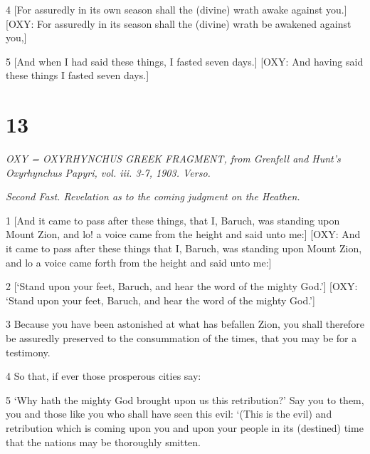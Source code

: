 \par [And be not greatly up lifted and boastful.] [OXY: Nor condemn greatly.]

\par 4 [For assuredly in its own season shall the (divine) wrath awake against you.] [OXY: For assuredly in its season shall the (divine) wrath be awakened against you,]

\par [Which now in long-suffering is held in as it were by reins.] [OXY: Which is now restrained by long-suffering as it were by a rein.]

\par 5 [And when I had said these things, I fasted seven days.] [OXY: And having said these things I fasted seven days.]


\chapter{13}

\par \textit{OXY = OXYRHYNCHUS GREEK FRAGMENT, from Grenfell and Hunt's Oxyrhynchus Papyri, vol. iii. 3-7, 1903. Verso.}

\par \textit{Second Fast. Revelation as to the coming judgment on the Heathen.}

\par 1 [And it came to pass after these things, that I, Baruch, was standing upon Mount Zion, and lo! a voice came from the height and said unto me:] [OXY: And it came to pass after these things that I, Baruch, was standing upon Mount Zion, and lo a voice came forth from the height and said unto me:]

\par 2 [‘Stand upon your feet, Baruch, and hear the word of the mighty God.’] [OXY: ‘Stand upon your feet, Baruch, and hear the word of the mighty God.’]

\par 3 Because you have been astonished at what has befallen Zion, you shall therefore be assuredly preserved to the consummation of the times, that you may be for a testimony. 

\par 4 So that, if ever those prosperous cities say: 

\par 5 ‘Why hath the mighty God brought upon us this retribution?’ Say you to them, you and those like you who shall have seen this evil: ‘(This is the evil) and retribution which is coming upon you and upon your people in its (destined) time that the nations may be thoroughly smitten. 

